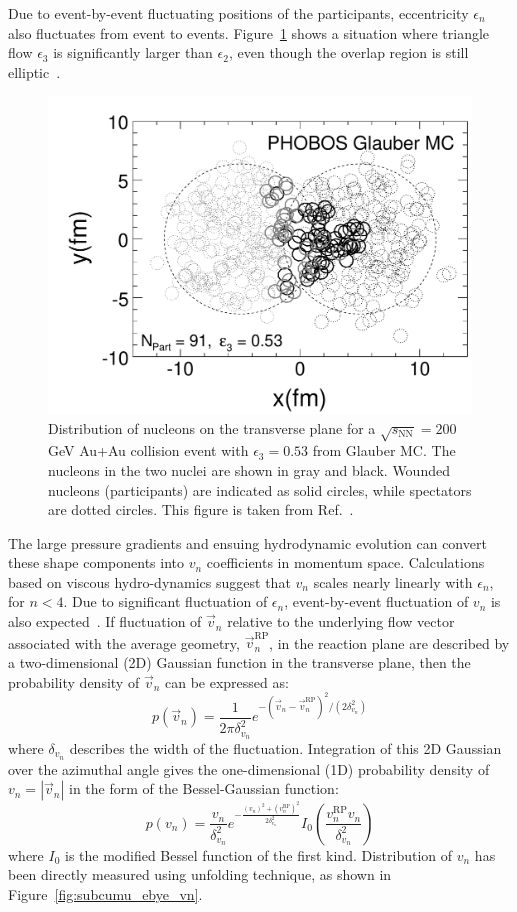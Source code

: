 Due to event-by-event fluctuating positions of the participants, eccentricity $\epsilon_n$ also fluctuates from event to events. Figure~\ref{fig:subcumu_Glauber_v3} shows a situation where triangle flow $\epsilon_3$ is significantly larger than $\epsilon_2$, even though the overlap region is still elliptic~\cite{Alver:2010gr}.

\begin{figure}[H]
\centering
\includegraphics[width=.5\linewidth]{figs/chapter_subcumu/Glauber_v3.pdf}
\caption{Distribution of nucleons on the transverse plane for a $\sqrt{s_\text{NN}}=200$ GeV Au+Au collision event with $\epsilon_3=0.53$ from Glauber MC. The nucleons in the two nuclei are shown in gray and black. Wounded nucleons (participants) are indicated as solid circles, while spectators are dotted circles. This figure is taken from Ref.~\cite{Alver:2010gr}.}
\label{fig:subcumu_Glauber_v3}
\end{figure}

The large pressure gradients and ensuing hydrodynamic evolution can convert these shape components into $v_n$ coefficients in momentum space. Calculations based on viscous hydro-dynamics suggest that $v_n$ scales nearly linearly with $\epsilon_n$, for $n<4$. Due to significant fluctuation of $\epsilon_n$, event-by-event fluctuation of $v_n$ is also expected~\cite{Aad:2013xma}. If fluctuation of $\vec{v}_n$ relative to the underlying flow vector associated with the average geometry, $\vec{v}_n^\text{RP}$, in the reaction plane are described by a two-dimensional (2D) Gaussian function in the transverse plane, then the probability density of $\vec{v}_n$ can be expressed as:
\begin{equation}
p(\vec{v}_n) = \frac{1}{2\pi\delta_{v_n}^2}e^{-(\vec{v}_n-\vec{v}_n^\text{RP})^2/(2\delta_{v_n}^2)}
\end{equation}
where $\delta_{v_n}$ describes the width of the fluctuation. Integration of this 2D Gaussian over the azimuthal angle gives the one-dimensional (1D) probability density of $v_n=|\vec{v}_n|$ in the form of the Bessel-Gaussian function:
\begin{equation}
p(v_n) = \frac{v_n}{\delta_{v_n}^2} e^{-\frac{(v_n)^2 + (v_n^\text{RP})^2}{2\delta_{v_n}^2}} I_0(\frac{v_n^\text{RP} v_n}{\delta_{v_n}^2})
\end{equation}
where $I_0$ is the modified Bessel function of the first kind. Distribution of $v_n$ has been directly measured using unfolding technique, as shown in Figure~\ref{fig:subcumu_ebye_vn}.

